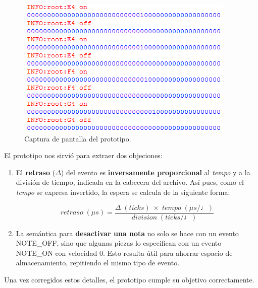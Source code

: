 \begin{figure}[H]
	\noindent \begin{centering}
		\includegraphics[width=\linewidth*2/3]{capitulo5/cap_pytest}
		\par\end{centering}
	\smallskip
	\caption{\label{fig:cap_pytest} Captura de pantalla del prototipo.}
\end{figure}

\smallskip

El prototipo nos sirvió para extraer dos objeciones:

\begin{enumerate}
	\item El \textbf{retraso} ($\Delta$) del evento es \textbf{inversamente proporcional} al \textit{tempo} y a la división de tiempo, indicada en la cabecera del archivo. Así pues, como el \textit{tempo} se expresa invertido, la espera se calcula de la siguiente forma:
	
	\begin{equation}
		retraso \; (\mu s)  = \frac{\Delta \; (ticks) \; \times \; tempo \; (\mu s / \quarternote)}{division \; (ticks / \quarternote)}
	\end{equation}
	
	\item La semántica para \textbf{desactivar una nota} no solo se hace con un evento NOTE\_OFF, sino que algunas piezas lo especifican con un evento NOTE\_ON con velocidad 0. Esto resulta útil para ahorrar espacio de almacenamiento, repitiendo el mismo tipo de evento.
\end{enumerate}

Una vez corregidos estos detalles, el prototipo cumple su objetivo correctamente. 

